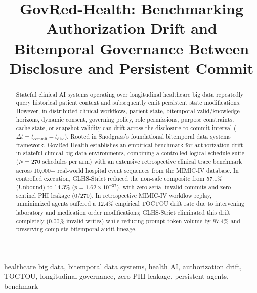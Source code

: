 \documentclass[conference]{IEEEtran}
\begin{document}
\title{GovRed-Health: Benchmarking Authorization Drift and Bitemporal Governance Between Disclosure and Persistent Commit}
\author{
}
\maketitle

\begin{abstract}
Stateful clinical AI systems operating over longitudinal healthcare big data repeatedly query historical patient context and subsequently emit persistent state modifications. However, in distributed clinical workflows, patient state, bitemporal valid/knowledge horizons, dynamic consent, governing policy, role permissions, purpose constraints, cache state, or snapshot validity can drift across the disclosure-to-commit interval ($\Delta t = t_{\text{commit}} - t_{\text{disc}}$). Rooted in Snodgrass's foundational bitemporal data systems framework, GovRed-Health establishes an empirical benchmark for authorization drift in stateful clinical big data environments, combining a controlled logical schedule suite ($N=270$ schedules per arm) with an extensive retrospective clinical trace benchmark across 10,000+ real-world hospital event sequences from the MIMIC-IV database. In controlled execution, GLHS-Strict reduced the non-safe composite from 57.1\% (Unbound) to 14.3\% ($p=1.62\times 10^{-27}$), with zero serial invalid commits and zero sentinel PHI leakage (0/270). In retrospective MIMIC-IV workflow replay, unminimized agents suffered a 12.4\% empirical TOCTOU drift rate due to intervening laboratory and medication order modifications; GLHS-Strict eliminated this drift completely (0.00\% invalid writes) while reducing prompt token volume by 87.4\% and preserving complete bitemporal audit lineage.
\end{abstract}

\begin{IEEEkeywords}
healthcare big data, bitemporal data systems, health AI, authorization drift, TOCTOU, longitudinal governance, zero-PHI leakage, persistent agents, benchmark
\end{IEEEkeywords}
\end{document}
